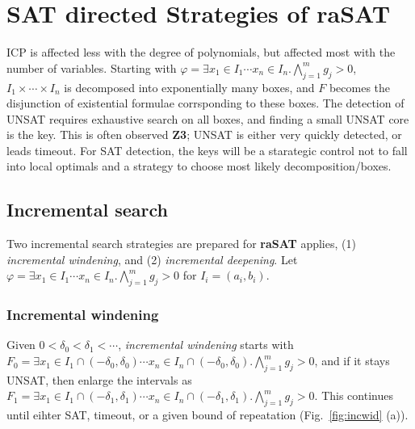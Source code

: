\documentclass[runningheads,a4paper,oribibl]{llncs}
\begin{document}
\section{SAT directed Strategies of {\bf raSAT}} \label{sec:strategy}

ICP is affected less with the degree of polynomials, but affected most with the number of variables. 
Starting with $\varphi = \exists x_1 \in I_1 \cdots x_n \in I_n. \bigwedge \limits_{j=1}^m g_j > 0$, 
$I_1 \times \cdots \times I_n$ is decomposed into exponentially many boxes, 
and $F$ becomes the disjunction of existential formulae corrsponding to these boxes.
The detection of UNSAT requires exhaustive search on all boxes, and finding a small UNSAT core
is the key. This is often observed {\bf Z3}; UNSAT is either very quickly detected, or leads timeout. 
For SAT detection, the keys will be a starategic control not to fall into local optimals and
a strategy to choose most likely decomposition/boxes. 

\subsection{Incremental search} \label{sec:incsearch}

Two incremental search strategies are prepared for {\bf raSAT} applies, 
(1) {\em incremental windening}, and (2) {\em incremental deepening}. 
Let
$\varphi = \exists x_1 \in I_1 \cdots x_n \in I_n. \bigwedge \limits_{j=1}^m g_j > 0$
for $I_i = (a_i,b_i)$. %

\subsubsection*{Incremental windening}
Given $0 < \delta_0 < \delta_1 < \cdots$, 
{\em incremental windening} starts with 
$F_0 = \exists x_1 \in I_1 \cap (-\delta_0 , \delta_0) \cdots x_n \in I_n \cap (-\delta_0 , \delta_0). 
\bigwedge \limits_{j=1}^m g_j > 0$, 
and if it stays  UNSAT, then enlarge the intervals as 
$F_1 = \exists x_1 \in I_1 \cap (-\delta_1 , \delta_1) \cdots x_n \in I_n \cap (-\delta_1 , \delta_1). 
\bigwedge \limits_{j=1}^m g_j > 0$. This continues until eihter SAT, timeout, or
a given bound of repeatation (Fig.~\ref{fig:incwid} (a)). 
\end{document}

